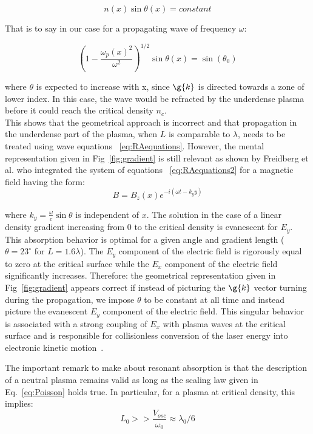\begin{equation}
n(x) \sin\theta(x) = constant
\end{equation}

\noindent That is to say in our case for a propagating wave of frequency $\omega$:

\begin{equation}
(1 - \frac{\omega_p(x)^2}{\omega^2})^{1/2}\sin\theta(x) = \sin(\theta_0)
\end{equation}

\noindent where $\theta$ is expected to increase with x, since $\g{k}$ is directed towards a zone of lower index. In this case, the wave would be refracted by the underdense plasma before it could reach the critical density $n_c$. \\

\noindent This shows that the geometrical approach is incorrect and that propagation in the underdense part  of the plasma, when $L$ is comparable to $\lambda$, needs to be treated using wave equations ~\ref{eq:RAequations}. However, the mental representation given in Fig~\ref{fig:gradient} is still relevant as shown by Freidberg et al. \cite{freidberg1972resonant} who integrated the system of equations ~\ref{eq:RAequations2} for a magnetic field having the form:
$$
B = B_z(x)e^{-i(\omega t - k_y y)}
$$

\noindent where $k_y = \frac{\omega}{c}\sin\theta$ is independent of $x$. The solution in the case of a linear density gradient increasing from $0$ to the critical density is evanescent for $E_y$. This absorption behavior is optimal for a given angle and gradient length ($\theta = 23^{\circ}$ for $L = 1.6 \lambda$). The $E_y$ component of the electric field is rigorously equal to zero at the critical surface while the $E_x$ component of the electric field significantly increases. Therefore: the geometrical representation given in Fig~\ref{fig:gradient} appears correct if instead of picturing the $\g{k}$ vector turning during the propagation, we impose $\theta$ to be constant at all time and instead picture the evanescent $E_y$ component of the electric field.
This singular behavior is associated with a strong coupling of $E_x$ with plasma waves at the critical surface and is responsible for collisionless conversion of the laser energy into electronic kinetic motion~\cite{freidberg1972resonant}.

\noindent The important remark to make about resonant absorption is that the description of a neutral plasma remains valid as long as the scaling law given in Eq.~\ref{eq:Poisson} holds true. In particular, for a plasma at critical density, this implies:
$$
L_0 >> \frac{V_{osc}}{\omega_0}\approx \lambda_0/6
$$


